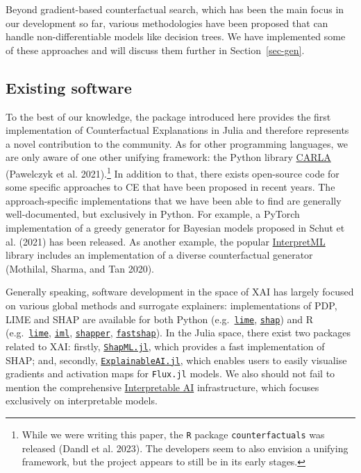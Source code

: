 \documentclass{juliacon}
\begin{document}
Beyond gradient-based counterfactual search, which has been the main
focus in our development so far, various methodologies have been
proposed that can handle non-differentiable models like decision trees.
We have implemented some of these approaches and will discuss them
further in Section~\ref{sec-gen}.

\hypertarget{existing-software}{%
\subsection{Existing software}\label{existing-software}}

To the best of our knowledge, the package introduced here provides the
first implementation of Counterfactual Explanations in Julia and
therefore represents a novel contribution to the community. As for other
programming languages, we are only aware of one other unifying
framework: the Python library
\href{https://carla-counterfactual-and-recourse-library.readthedocs.io/en/latest/?badge=latest}{CARLA}
(Pawelczyk et al. 2021).\footnote{While we were writing this paper, the
  \texttt{R} package \texttt{counterfactuals} was released (Dandl et al.
  2023). The developers seem to also envision a unifying framework, but
  the project appears to still be in its early stages.} In addition to
that, there exists open-source code for some specific approaches to CE
that have been proposed in recent years. The approach-specific
implementations that we have been able to find are generally
well-documented, but exclusively in Python. For example, a PyTorch
implementation of a greedy generator for Bayesian models proposed in
Schut et al. (2021) has been released. As another example, the popular
\href{https://github.com/interpretml}{InterpretML} library includes an
implementation of a diverse counterfactual generator (Mothilal, Sharma,
and Tan 2020).

Generally speaking, software development in the space of XAI has largely
focused on various global methods and surrogate explainers:
implementations of PDP, LIME and SHAP are available for both Python
(e.g.~\href{https://github.com/marcotcr/lime}{\texttt{lime}},
\href{https://github.com/slundberg/shap}{\texttt{shap}}) and R
(e.g.~\href{https://cran.r-project.org/web/packages/lime/index.html}{\texttt{lime}},
\href{https://cran.r-project.org/web/packages/lime/index.html}{\texttt{iml}},
\href{https://modeloriented.github.io/shapper/}{\texttt{shapper}},
\href{https://github.com/bgreenwell/fastshap}{\texttt{fastshap}}). In
the Julia space, there exist two packages related to XAI: firstly,
\href{https://github.com/nredell/ShapML.jl}{\texttt{ShapML.jl}}, which
provides a fast implementation of SHAP; and, secondly,
\href{https://github.com/adrhill/ExplainableAI.jl}{\texttt{ExplainableAI.jl}},
which enables users to easily visualise gradients and activation maps
for \texttt{Flux.jl} models. We also should not fail to mention the
comprehensive
\href{https://docs.interpretable.ai/stable/IAIBase/data/}{Interpretable
AI} infrastructure, which focuses exclusively on interpretable models.
\end{document}
